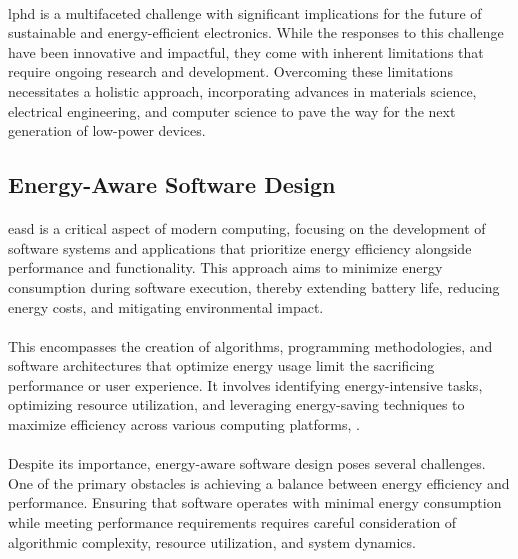         \paragraph{}
        \gls{lphd} is a multifaceted challenge with significant implications for the future of sustainable and energy-efficient electronics. While the responses to this challenge have been innovative and impactful, they come with inherent limitations that require ongoing research and development. Overcoming these limitations necessitates a holistic approach, incorporating advances in materials science, electrical engineering, and computer science to pave the way for the next generation of low-power devices.



    \subsection{Energy-Aware Software Design}

        \paragraph{}
        \gls{easd} is a critical aspect of modern computing, focusing on the development of software systems and applications that prioritize energy efficiency alongside performance and functionality. This approach aims to minimize energy consumption during software execution, thereby extending battery life, reducing energy costs, and mitigating environmental impact.

        \paragraph{}
        This encompasses the creation of algorithms, programming methodologies, and software architectures that optimize energy usage limit the sacrificing performance or user experience. It involves identifying energy-intensive tasks, optimizing resource utilization, and leveraging energy-saving techniques to maximize efficiency across various computing platforms\cite{basedArticle}, \cite{protean}.

        \paragraph{}
        Despite its importance, energy-aware software design poses several challenges. One of the primary obstacles is achieving a balance between energy efficiency and performance. Ensuring that software operates with minimal energy consumption while meeting performance requirements requires careful consideration of algorithmic complexity, resource utilization, and system dynamics\cite{9803046}.

